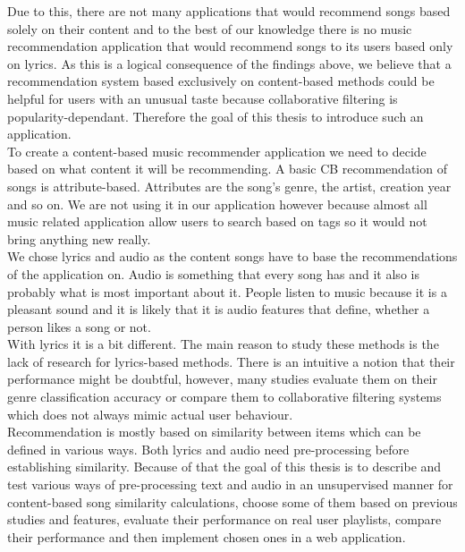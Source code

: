 Due to this, there are not many applications that would recommend songs based solely on their content and to the best of our knowledge there is no music recommendation application that would recommend songs to its users based only on lyrics. As this is a logical consequence of the findings above, we believe that a recommendation system based exclusively on content-based methods could be helpful for users with an unusual taste because collaborative filtering is popularity-dependant. Therefore the goal of this thesis to introduce such an application. \\
To create a content-based music recommender application we need to decide based on what content it will be recommending. A basic CB recommendation of songs is attribute-based. Attributes are the song's genre, the artist, creation year and so on. We are not using it in our application however because almost all music related application allow users to search based on tags so it would not bring anything new really. \\
We chose lyrics and audio as the content songs have to base the recommendations of the application on. Audio is something that every song has and it also is probably what is most important about it. People listen to music because it is a pleasant sound and it is likely that it is audio features that define, whether a person likes a song or not. \\
With lyrics it is a bit different. The main reason to study these methods is the lack of research for lyrics-based methods. There is an intuitive a notion that their performance might be doubtful, however, many studies evaluate them on their genre classification accuracy \cite{DBLP:journals/corr/Tsaptsinos17} or compare them to collaborative filtering systems \cite{Gossi2016LyricBasedMR} which does not always mimic actual user behaviour. \\
Recommendation is mostly based on similarity between items which can be defined in various ways. Both lyrics and audio need pre-processing before establishing similarity. Because of that the goal of this thesis is to describe and test various ways of pre-processing text and audio in an unsupervised manner for content-based song similarity calculations, choose some of them based on previous studies and features, evaluate their performance on real user playlists, compare their performance and then implement chosen ones in a web application.\\
